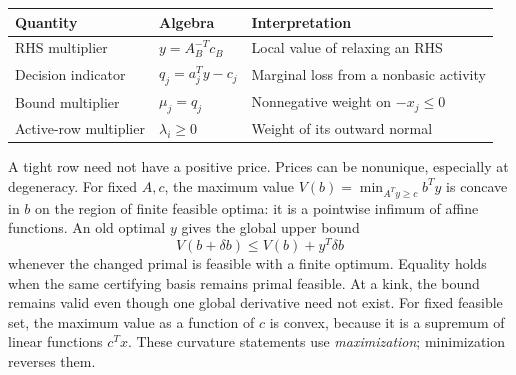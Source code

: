 \documentclass[11pt,a4paper]{article}
\begin{document}
\begin{center}
  \begin{tabular}{>{\raggedright\arraybackslash}p{3.4cm}>{\raggedright\arraybackslash}p{4.6cm}>{\raggedright\arraybackslash}p{5.1cm}}
    \toprule
    Quantity & Algebra & Interpretation\\\midrule
    RHS multiplier & $y=A_B^{-T}c_B$ & Local value of relaxing an RHS\\
    Decision indicator & $q_j=a_j^Ty-c_j$ & Marginal loss from a nonbasic activity\\
    Bound multiplier & $\mu_j=q_j$ & Nonnegative weight on $-x_j\leq0$\\
    Active-row multiplier & $\lambda_i\geq0$ & Weight of its outward normal\\\bottomrule
  \end{tabular}
\end{center}
A tight row need not have a positive price. Prices can be nonunique,
especially at degeneracy. For fixed $A,c$, the maximum value
$V(b)=\min_{A^Ty\geq c}b^Ty$ is concave in $b$ on the region of finite
feasible optima: it is a pointwise infimum of affine functions.
An old optimal $y$ gives the global upper bound
\[
  V(b+\delta b)\leq V(b)+y^T\delta b
\]
whenever the changed primal is feasible with a finite optimum.
Equality holds when the same certifying basis remains primal feasible.
At a kink, the bound remains valid even though one global derivative need
not exist. For fixed feasible set, the maximum value as a function of $c$ is
convex, because it is a supremum of linear functions $c^Tx$.
These curvature statements use \emph{maximization}; minimization reverses them.
\end{document}
